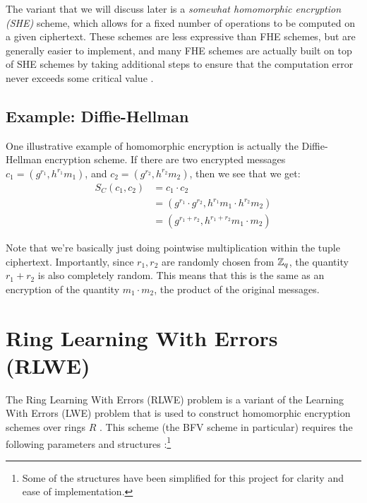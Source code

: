 \documentclass{theme}
\begin{document}
The variant that we will discuss later is a \textit{somewhat homomorphic encryption (SHE)} scheme, which allows for a fixed number of operations to be computed on a given ciphertext. These schemes are less expressive than FHE schemes, but are generally easier to implement, and many FHE schemes are actually built on top of SHE schemes by taking additional steps to ensure that the computation error never exceeds some critical value \cite{fhe}.

\subsection{Example: Diffie-Hellman}

One illustrative example of homomorphic encryption is actually the Diffie-Hellman encryption scheme. If there are two encrypted messages $c_1 = (g^{r_1}, h^{r_1} m_1)$, and $c_2 = (g^{r_2}, h^{r_2} m_2)$, then we see that we get:
\begin{align}
    S_C(c_1, c_2) & = c_1 \cdot c_2                                          \\
                  & = (g^{r_1} \cdot g^{r_2}, h^{r_1} m_1 \cdot h^{r_2} m_2) \\
                  & = (g^{r_1 + r_2}, h^{r_1 + r_2} m_1 \cdot m_2)
\end{align}

Note that we're basically just doing pointwise multiplication within the tuple ciphertext. Importantly, since $r_1, r_2$ are randomly chosen from $\mathbb{Z}_q$, the quantity $r_1 + r_2$ is also completely random. This means that this is the same as an encryption of the quantity $m_1 \cdot m_2$, the product of the original messages.

\section{Ring Learning With Errors (RLWE)}

The Ring Learning With Errors (RLWE) problem is a variant of the Learning With Errors (LWE) problem that is used to construct homomorphic encryption schemes over rings $R$ \cite{fhe}. This scheme (the BFV scheme in particular) requires the following parameters and structures \cite{fhe}:\footnote{Some of the structures have been simplified for this project for clarity and ease of implementation.}
\end{document}
